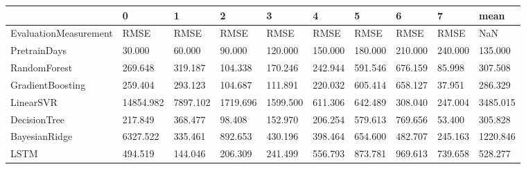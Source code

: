 \begin{tabular}{llllllllll}
\toprule
{} &         0 &        1 &        2 &        3 &       4 &       5 &       6 &       7 &     mean \\
\midrule
EvaluationMeasurement &      RMSE &     RMSE &     RMSE &     RMSE &    RMSE &    RMSE &    RMSE &    RMSE &      NaN \\
PretrainDays          &    30.000 &   60.000 &   90.000 &  120.000 & 150.000 & 180.000 & 210.000 & 240.000 &  135.000 \\
RandomForest          &   269.648 &  319.187 &  104.338 &  170.246 & 242.944 & 591.546 & 676.159 &  85.998 &  307.508 \\
GradientBoosting      &   259.404 &  293.123 &  104.687 &  111.891 & 220.032 & 605.414 & 658.127 &  37.951 &  286.329 \\
LinearSVR             & 14854.982 & 7897.102 & 1719.696 & 1599.500 & 611.306 & 642.489 & 308.040 & 247.004 & 3485.015 \\
DecisionTree          &   217.849 &  368.477 &   98.408 &  152.970 & 206.254 & 579.613 & 769.656 &  53.400 &  305.828 \\
BayesianRidge         &  6327.522 &  335.461 &  892.653 &  430.196 & 398.464 & 654.600 & 482.707 & 245.163 & 1220.846 \\
LSTM                  &   494.519 &  144.046 &  206.309 &  241.499 & 556.793 & 873.781 & 969.613 & 739.658 &  528.277 \\
\bottomrule
\end{tabular}
